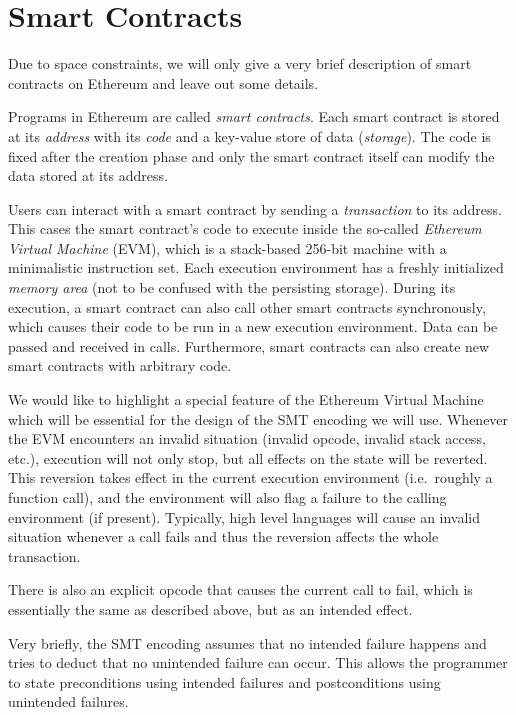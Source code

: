 \section{Smart Contracts}
\label{section:smart_contracts}

Due to space constraints, we will only give a very brief description
of smart contracts on Ethereum and leave out some details.

Programs in Ethereum are called \emph{smart contracts}.
Each smart contract is stored at its \emph{address} with its \emph{code}
and a key-value store of data (\emph{storage}). The code is fixed after the creation phase
and only the smart contract itself can modify the data stored at its address.

Users can interact with a smart contract by sending a \emph{transaction}
to its address. This cases the smart contract's code to execute inside
the so-called \emph{Ethereum Virtual Machine} (EVM), which is a stack-based
256-bit machine with a minimalistic instruction set. Each execution environment
has a freshly initialized \emph{memory area} (not to be confused with the persisting
storage). During its execution, a smart contract can also call other
smart contracts synchronously, which causes their code to be run in
a new execution environment. Data can be passed and received in calls.
Furthermore, smart contracts can also create new smart contracts with
arbitrary code.

We would like to highlight a special feature of the Ethereum Virtual Machine
which will be essential for the design of the SMT encoding we will use.
Whenever the EVM encounters an invalid situation (invalid opcode, invalid
stack access, etc.), execution will not only stop, but all effects on the
state will be reverted. This reversion takes effect in the current execution
environment (i.e.\ roughly a function call), and the environment will also
flag a failure to the calling environment (if present). Typically, high level languages
will cause an invalid situation whenever a call fails and thus the reversion
affects the whole transaction.

There is also an explicit opcode that causes the current call to fail, which is
essentially the same as described above, but as an intended effect.

Very briefly, the SMT encoding assumes that no intended failure happens
and tries to deduct that no unintended failure can occur. This allows the
programmer to state preconditions using intended failures and postconditions
using unintended failures.
